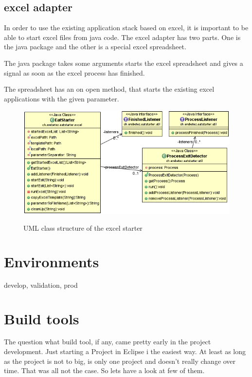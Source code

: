 \documentclass[paper=a4,twoside=false,BCOR=0mm,DIV=calc,fontsize=12pt]{scrartcl}
\begin{document}
\subsection{excel adapter}
In order to use the existing application stack based on excel, it is important to be able to start excel files from java code. 
The excel adapter has two parts. One is the java package and the other is a special excel spreadsheet. 

The java package takes some arguments starts the excel spreadsheet and gives a signal as soon as the excel process has finished.

The spreadsheet has an on open method, that starts the existing excel applications with the given parameter.

\begin{figure}
    \begin{center}
      \includegraphics[width=1\textwidth]{./img/uml_eatstatreter_model.png}\\
    \end{center}
  \caption{UML class structure of the excel starter}
  \label{eatstarterclassuml}
\end{figure} 

\section{Environments}
develop, validation, prod

\section{Build tools}
The question what build tool, if any, came pretty early in the project development. Just starting a Project in Eclipse i the easiest way. 
At least as long as the project is not to big, is only one project and doesn't really change over time. That was all not the case. So lets have a look at few of them. 
\end{document}
